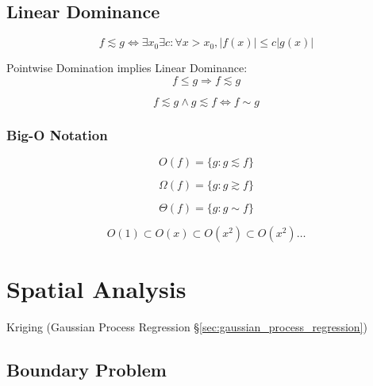 \subsection{Linear Dominance}\label{sec:linear_dominance}

\[
    f \lesssim g \Leftrightarrow
    \exists x_0 \exists c : \forall x > x_0, |f(x)| \leq c |g(x)|
\]

Pointwise Domination implies Linear Dominance:
\[
    f \leq g \Rightarrow f \lesssim g
\]

\[
    f \lesssim g \wedge g \lesssim f \Leftrightarrow f \sim g
\]



\subsubsection{Big-O Notation}\label{sec:bigo_notation}

\[
    O(f) = \{ g : g \lesssim f \}
\]

\[
    \Omega(f) = \{ g : g \gtrsim f \}
\]

\[
    \Theta(f) = \{ g : g \sim f \}
\]

\[
    O(1) \subset O(x) \subset O(x^2) \subset O(x^2) \ldots
\]



\section{Spatial Analysis}\label{sec:spatial_analysis}


Kriging (Gaussian Process Regression \S\ref{sec:gaussian_process_regression})



\subsection{Boundary Problem}\label{sec:boundary_problem}





